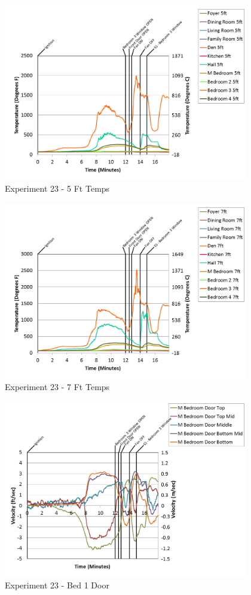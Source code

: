 \documentclass{article}
\begin{document}
\begin{appendices}
\begin{figure}[h!]
	\centering
	\includegraphics[height=3.05in]{0_Images/Results_Charts/Exp_23_Charts/5FtTemps.png}
	\caption{Experiment 23 - 5 Ft Temps}
\end{figure}


\begin{figure}[h!]
	\centering
	\includegraphics[height=3.05in]{0_Images/Results_Charts/Exp_23_Charts/7FtTemps.png}
	\caption{Experiment 23 - 7 Ft Temps}
\end{figure}

\clearpage

\begin{figure}[h!]
	\centering
	\includegraphics[height=3.05in]{0_Images/Results_Charts/Exp_23_Charts/Bed1Door.png}
	\caption{Experiment 23 - Bed 1 Door}
\end{figure}



\end{appendices}
\end{document}
